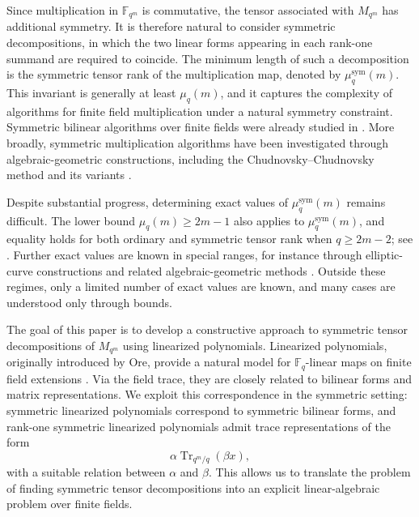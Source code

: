 \documentclass[11pt,a4paper,reqno]{article}
\numberwithin{equation}{section}
\theoremstyle{definition}
\begin{document}
Since multiplication in \(\mathbb F_{q^m}\) is commutative, the tensor
associated with \(M_{q^m}\) has additional symmetry. It is therefore natural
to consider symmetric decompositions, in which the two linear forms appearing
in each rank-one summand are required to coincide. The minimum length of such
a decomposition is the symmetric tensor rank of the multiplication map,
denoted by \(\mu_q^{\mathrm{sym}}(m)\). This invariant is generally at least
\(\mu_q(m)\), and it captures the complexity of algorithms for finite field
multiplication under a natural symmetry constraint. Symmetric bilinear
algorithms over finite fields were already studied in
\cite{seroussi1984symmetric}. More broadly, symmetric multiplication
algorithms have been investigated through algebraic-geometric constructions,
including the Chudnovsky--Chudnovsky method and its variants
\cite{ballet2021tensor,chaumine2006bilinear,chudnovsky1988algebraic,shokrollahi1992optimal}.

Despite substantial progress, determining exact values of
\(\mu_q^{\mathrm{sym}}(m)\) remains difficult. The lower bound $\mu_q(m)\geq 2m-1$ also applies to \(\mu_q^{\mathrm{sym}}(m)\), and equality holds for both
ordinary and symmetric tensor rank when \(q\geq 2m-2\); see
\cite[Theorem~2.2]{ballet2021tensor}. Further exact values are known in
special ranges, for instance through elliptic-curve constructions and
related algebraic-geometric methods
\cite{chaumine2006bilinear,chudnovsky1988algebraic, shokrollahi1992optimal}.
Outside these regimes, only a limited number of exact values are known, and
many cases are understood only through bounds.

The goal of this paper is to develop a constructive approach to symmetric
tensor decompositions of \(M_{q^m}\) using linearized polynomials. Linearized
polynomials, originally introduced by Ore, provide a natural model for
\(\mathbb F_q\)-linear maps on finite field extensions
\cite{lidl1997finite,ore1933special}. Via the field trace, they are closely
related to bilinear forms and matrix representations. We exploit this
correspondence in the symmetric setting: symmetric linearized polynomials
correspond to symmetric bilinear forms, and rank-one symmetric linearized
polynomials admit trace representations of the form
\[
\alpha \operatorname{Tr}_{q^m/q}(\beta x),
\]
with a suitable relation between \(\alpha\) and \(\beta\). This allows us to
translate the problem of finding symmetric tensor decompositions into an
explicit linear-algebraic problem over finite fields.
\end{document}
